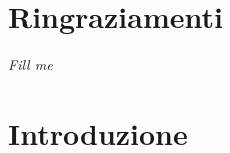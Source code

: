 \chapter*{Ringraziamenti} %
\begin{flushright}
\itshape 
Fill me
\end{flushright}


\chapter{Introduzione}

